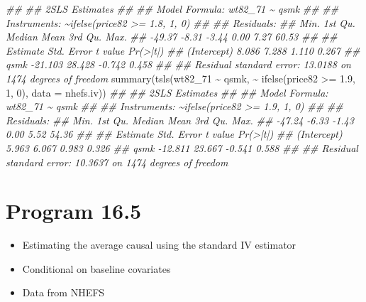 \documentclass[
  10pt,
  a4paper,
]{book}
\newenvironment{Shaded}{\begin{snugshade}}{\end{snugshade}}
\newcommand{\AttributeTok}[1]{\textcolor[rgb]{0.40,0.45,0.13}{#1}}
\newcommand{\DecValTok}[1]{\textcolor[rgb]{0.68,0.00,0.00}{#1}}
\newcommand{\DocumentationTok}[1]{\textcolor[rgb]{0.37,0.37,0.37}{\textit{#1}}}
\newcommand{\FloatTok}[1]{\textcolor[rgb]{0.68,0.00,0.00}{#1}}
\newcommand{\FunctionTok}[1]{\textcolor[rgb]{0.28,0.35,0.67}{#1}}
\newcommand{\NormalTok}[1]{\textcolor[rgb]{0.00,0.46,0.62}{#1}}
\newcommand{\SpecialCharTok}[1]{\textcolor[rgb]{0.37,0.37,0.37}{#1}}
\providecommand{\tightlist}{%
  \setlength{\itemsep}{0pt}\setlength{\parskip}{0pt}}
\begin{document}
\begin{Shaded}
\begin{Highlighting}[]
\DocumentationTok{\#\# }
\DocumentationTok{\#\#  2SLS Estimates}
\DocumentationTok{\#\# }
\DocumentationTok{\#\# Model Formula: wt82\_71 \textasciitilde{} qsmk}
\DocumentationTok{\#\# }
\DocumentationTok{\#\# Instruments: \textasciitilde{}ifelse(price82 \textgreater{}= 1.8, 1, 0)}
\DocumentationTok{\#\# }
\DocumentationTok{\#\# Residuals:}
\DocumentationTok{\#\#    Min. 1st Qu.  Median    Mean 3rd Qu.    Max. }
\DocumentationTok{\#\#  {-}49.37   {-}8.31   {-}3.44    0.00    7.27   60.53 }
\DocumentationTok{\#\# }
\DocumentationTok{\#\#             Estimate Std. Error t value Pr(\textgreater{}|t|)}
\DocumentationTok{\#\# (Intercept)    8.086      7.288   1.110    0.267}
\DocumentationTok{\#\# qsmk         {-}21.103     28.428  {-}0.742    0.458}
\DocumentationTok{\#\# }
\DocumentationTok{\#\# Residual standard error: 13.0188 on 1474 degrees of freedom}
\FunctionTok{summary}\NormalTok{(}\FunctionTok{tsls}\NormalTok{(wt82\_71 }\SpecialCharTok{\textasciitilde{}}\NormalTok{ qsmk, }\SpecialCharTok{\textasciitilde{}} \FunctionTok{ifelse}\NormalTok{(price82 }\SpecialCharTok{\textgreater{}=} \FloatTok{1.9}\NormalTok{, }\DecValTok{1}\NormalTok{, }\DecValTok{0}\NormalTok{), }\AttributeTok{data =}\NormalTok{ nhefs.iv))}
\DocumentationTok{\#\# }
\DocumentationTok{\#\#  2SLS Estimates}
\DocumentationTok{\#\# }
\DocumentationTok{\#\# Model Formula: wt82\_71 \textasciitilde{} qsmk}
\DocumentationTok{\#\# }
\DocumentationTok{\#\# Instruments: \textasciitilde{}ifelse(price82 \textgreater{}= 1.9, 1, 0)}
\DocumentationTok{\#\# }
\DocumentationTok{\#\# Residuals:}
\DocumentationTok{\#\#    Min. 1st Qu.  Median    Mean 3rd Qu.    Max. }
\DocumentationTok{\#\#  {-}47.24   {-}6.33   {-}1.43    0.00    5.52   54.36 }
\DocumentationTok{\#\# }
\DocumentationTok{\#\#             Estimate Std. Error t value Pr(\textgreater{}|t|)}
\DocumentationTok{\#\# (Intercept)    5.963      6.067   0.983    0.326}
\DocumentationTok{\#\# qsmk         {-}12.811     23.667  {-}0.541    0.588}
\DocumentationTok{\#\# }
\DocumentationTok{\#\# Residual standard error: 10.3637 on 1474 degrees of freedom}
\end{Highlighting}
\end{Shaded}

\hypertarget{program-16.5}{%
\section{Program 16.5}\label{program-16.5}}

\begin{itemize}
\tightlist
\item
  Estimating the average causal using the standard IV estimator
\item
  Conditional on baseline covariates
\item
  Data from NHEFS
\end{itemize}
\end{document}
